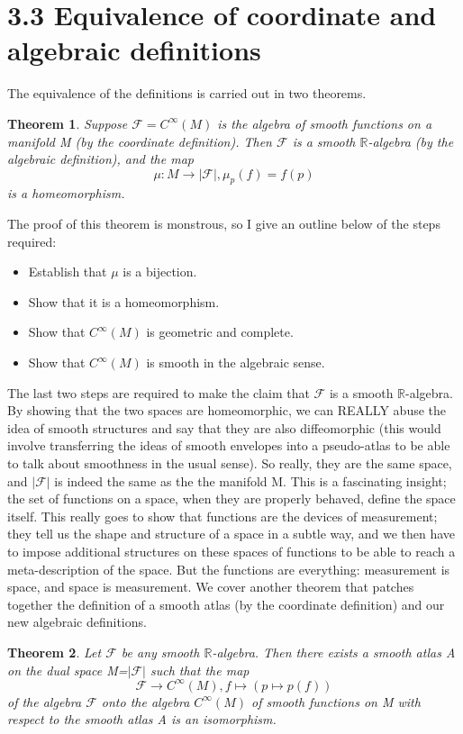 \documentclass[12pt]{extarticle}
\newcommand\Reals{{\mathbb{R}}}
\newcommand{\ff}{\mathcal{F}}
\newtheorem{theorem}{Theorem}
\begin{document}
\section*{3.3 Equivalence of coordinate and algebraic definitions}
The equivalence of the definitions is carried out in two theorems.
\begin{theorem}
Suppose $\ff=C^\infty(M)$ is the algebra of smooth functions on a manifold M (by the coordinate definition). Then $\ff$ is a smooth $\Reals$-algebra (by the algebraic definition), and the map
\begin{equation}
\mu:M\to |\ff|, \mu_p(f) = f(p)
\end{equation}
is a homeomorphism.
\end{theorem}
The proof of this theorem is monstrous, so I give an outline below of the steps required:
\begin{itemize}
\item
Establish that $\mu$ is a bijection.
\item
Show that it is a homeomorphism.
\item
Show that $C^\infty(M)$ is geometric and complete.
\item
Show that $C^\infty(M)$ is smooth in the algebraic sense.
\end{itemize}
The last two steps are required to make the claim that $\ff$ is a smooth $\Reals$-algebra. By showing that the two spaces are homeomorphic, we can REALLY abuse the idea of smooth structures and say that they are also diffeomorphic (this would involve transferring the ideas of smooth envelopes into a pseudo-atlas to be able to talk about smoothness in the usual sense). So really, they are the same space, and $|\ff|$ is indeed the same as the the manifold M. This is a fascinating insight; the set of functions on a space, when they are properly behaved, define the space itself. This really goes to show that functions are the devices of measurement; they tell us the shape and structure of a space in a subtle way, and we then have to impose additional structures on these spaces of functions to be able to reach a meta-description of the space. But the functions are everything: measurement is space, and space is measurement. We cover another theorem that patches together the definition of a smooth atlas (by the coordinate definition) and our new algebraic definitions.
\begin{theorem}
Let $\ff$ be any smooth $\Reals$-algebra. Then there exists a smooth atlas A on the dual space M=$|\ff|$ such that the map
\begin{equation}
\ff\to C^\infty(M), f\mapsto (p\mapsto p(f))
\end{equation}
of the algebra $\ff$ onto the algebra $C^\infty(M)$ of smooth functions on M with respect to the smooth atlas A is an isomorphism.
\end{theorem}
\end{document}
